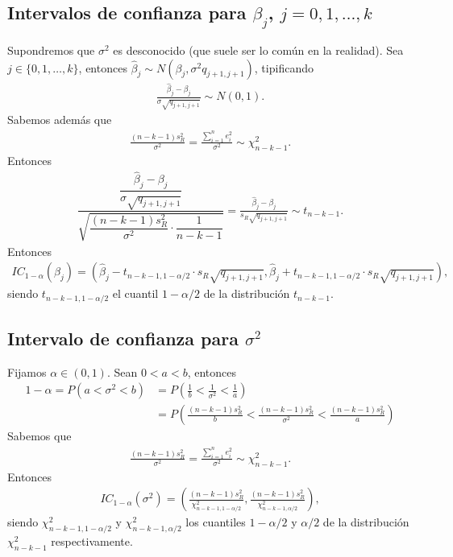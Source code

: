 \subsection{Intervalos de confianza para $\beta_j$, $j=0,1,\ldots,k$}
Supondremos que $\sigma^2$ es desconocido (que suele ser lo común en la realidad). Sea $j \in \{0,1,\ldots,k\}$, entonces $\widehat{\beta}_j \sim N(\beta_j, \sigma^2{q_{j+1,j+1}})$, tipificando
\begin{align*}
    \frac{\widehat{\beta}_j - \beta_j}{\sigma\sqrt{q_{j+1,j+1}}} \sim N(0,1).
\end{align*}
Sabemos además que
\begin{align*}
    \frac{(n-k-1)s_R^2}{\sigma^2} = \frac{\sum_{i=1}^{n} e_i^2}{\sigma^2} \sim \chi^2_{n-k-1}.
\end{align*}
Entonces
\begin{align*}
    \dfrac{\dfrac{\widehat{\beta}_j - \beta_j}{\sigma\sqrt{q_{j+1,j+1}}}}{\sqrt{\dfrac{(n-k-1)s_R^2}{\sigma^2} \cdot \dfrac{1}{n-k-1}}} = \frac{\widehat{\beta}_j - \beta_j}{s_R\sqrt{q_{j+1,j+1}}} \sim t_{n-k-1}.
\end{align*}
Entonces
\begin{align*}
    IC_{1-\alpha}(\beta_j) = \left( \widehat{\beta}_j - t_{n-k-1, 1 -\alpha/2} \cdot s_R \sqrt{q_{j+1,j+1}}, \widehat{\beta}_j + t_{n-k-1, 1 -\alpha/2} \cdot s_R \sqrt{q_{j+1,j+1}} \right),
\end{align*}
siendo $t_{n-k-1, 1 -\alpha/2}$ el cuantil $1 - \alpha/2$ de la distribución $t_{n-k-1}$.

\subsection{Intervalo de confianza para $\sigma^2$}
Fijamos $\alpha \in (0,1)$. Sean $0 < a < b$, entonces
\begin{align*}
    1 - \alpha = P(a < \sigma^2 < b) & = P\left( \frac{1}{b} < \frac{1}{\sigma^2} < \frac{1}{a}\right)                                  \\
                                     & = P\left( \frac{(n-k-1)s^2_R}{b} < \frac{(n-k-1)s^2_R}{\sigma^2} < \frac{(n-k-1)s^2_R}{a}\right)
\end{align*}
Sabemos que
\begin{align*}
    \frac{(n-k-1)s^2_R}{\sigma^2} = \frac{\sum_{i=1}^{n} e_i^2}{\sigma^2} \sim \chi^2_{n-k-1}.
\end{align*}
Entonces
\begin{align*}
    IC_{1-\alpha}(\sigma^2) = \left( \frac{(n-k-1)s^2_R}{\chi^2_{n-k-1,1-\alpha/2}}, \frac{(n-k-1)s^2_R}{\chi^2_{n-k-1,\alpha/2}} \right),
\end{align*}
siendo $\chi^2_{n-k-1,1-\alpha/2}$ y $\chi^2_{n-k-1,\alpha/2}$ los cuantiles $1-\alpha/2$ y $\alpha/2$ de la distribución $\chi^2_{n-k-1}$ respectivamente.

